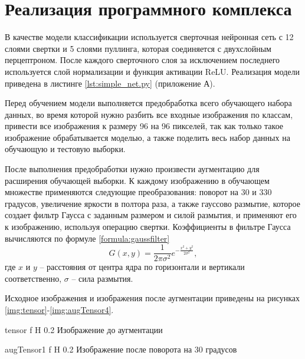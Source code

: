 \section{Реализация программного комплекса}

В качестве модели классификации используется сверточная нейронная сеть с 12 слоями свертки и 5 слоями пуллинга, которая соединяется с двухслойным перцептроном. После каждого сверточного слоя за исключением последнего используется слой нормализации и функция активации ReLU. Реализация модели приведена в листинге \ref{lst:simple_net.py} (приложение А).

Перед обучением модели выполняется предобработка всего обучающего набора данных, во время которой нужно разбить все входные изображения по классам, привести все изображения к размеру 96 на 96 пикселей, так как только такое изображение обрабатывается моделью, а также поделить весь набор данных на обучающую и тестовую выборки.

После выполнения предобработки нужно произвести аугментацию для расширения обучающей выборки. К каждому изображению в обучающем множестве применяются следующие преобразования: поворот на 30 и 330 градусов, увеличение яркости в полтора раза, а также гауссово размытие, которое создает фильтр Гаусса с заданным размером и силой размытия, и применяют его к изображению, используя операцию свертки. Коэффициенты в фильтре Гаусса вычисляются по формуле \ref{formula:gaussfilter}
\begin{equation}\label{formula:gaussfilter}
G(x,y) = \frac{1}{2\pi\sigma^2}e^{-\frac{x^2+y^2}{2\sigma^2}},
\end{equation}
где $x$ и $y$ -- расстояния от центра ядра по горизонтали и вертикали соответственно, $\sigma$ -- сила размытия.

Исходное изображения и изображения после аугментации приведены на рисунках \ref{img:tensor}-\ref{img:augTensor4}.

{tensor} %
{f} %
{H} %
{0.2\textwidth} %
{Изображение до аугментации} %

{augTensor1} %
{f} %
{H} %
{0.2\textwidth} %
{Изображение после поворота на 30 градусов} %

